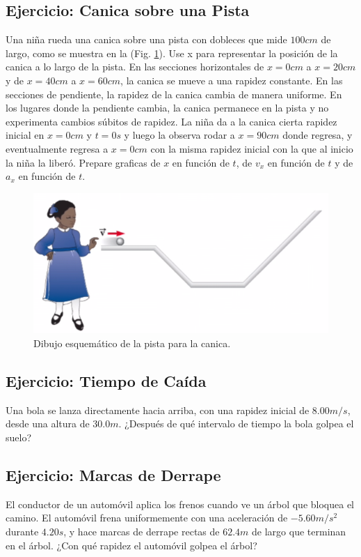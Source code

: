 \documentclass{replab}
\begin{document}
	\subsection{Ejercicio: Canica sobre una Pista}
	Una niña rueda una canica sobre una pista con dobleces que mide $100cm$ de largo, como se muestra en la (Fig. \ref{fig:pista2}). Use x para representar la posición de la canica a lo largo de la pista. En las secciones horizontales de $x=0cm$ a $x=20cm$ y de $x=40cm$ a $x=60cm$, la canica se mueve a una rapidez constante. En las secciones de pendiente, la rapidez de la canica cambia de manera uniforme. En los lugares donde la pendiente cambia, la canica permanece en la pista y no experimenta cambios súbitos de rapidez. La niña da a la canica cierta rapidez inicial en $x=0cm$ y $t=0s$ y luego la observa rodar a $x=90cm$ donde regresa, y eventualmente regresa a $x=0cm$ con la misma rapidez inicial con la que al inicio la niña la liberó. Prepare graficas de $x$ en función de $t$, de $v_x$ en función de $t$ y de $a_x$ en función de $t$. 
	
	\begin{figure}[htbp]
		\centering
		\includegraphics[width=.4\columnwidth]{imagenes/pista2.png}
		\caption{Dibujo esquemático de la pista para la canica.}
		\label{fig:pista2}
	\end{figure}

	\subsection{Ejercicio: Tiempo de Caída}
	Una bola se lanza directamente hacia arriba, con una rapidez inicial de $8.00m/s$, desde una altura de $30.0m$. ¿Después de qué intervalo de tiempo la bola golpea el suelo?
	
	\subsection{Ejercicio: Marcas de Derrape}
	El conductor de un automóvil aplica los frenos cuando ve un árbol que bloquea el camino. El automóvil frena uniformemente con una aceleración de $-5.60m/s^2$ durante $4.20s$, y hace marcas de derrape rectas de $62.4m$ de largo que terminan en el árbol. ¿Con qué rapidez el automóvil golpea el árbol?
\end{document}
